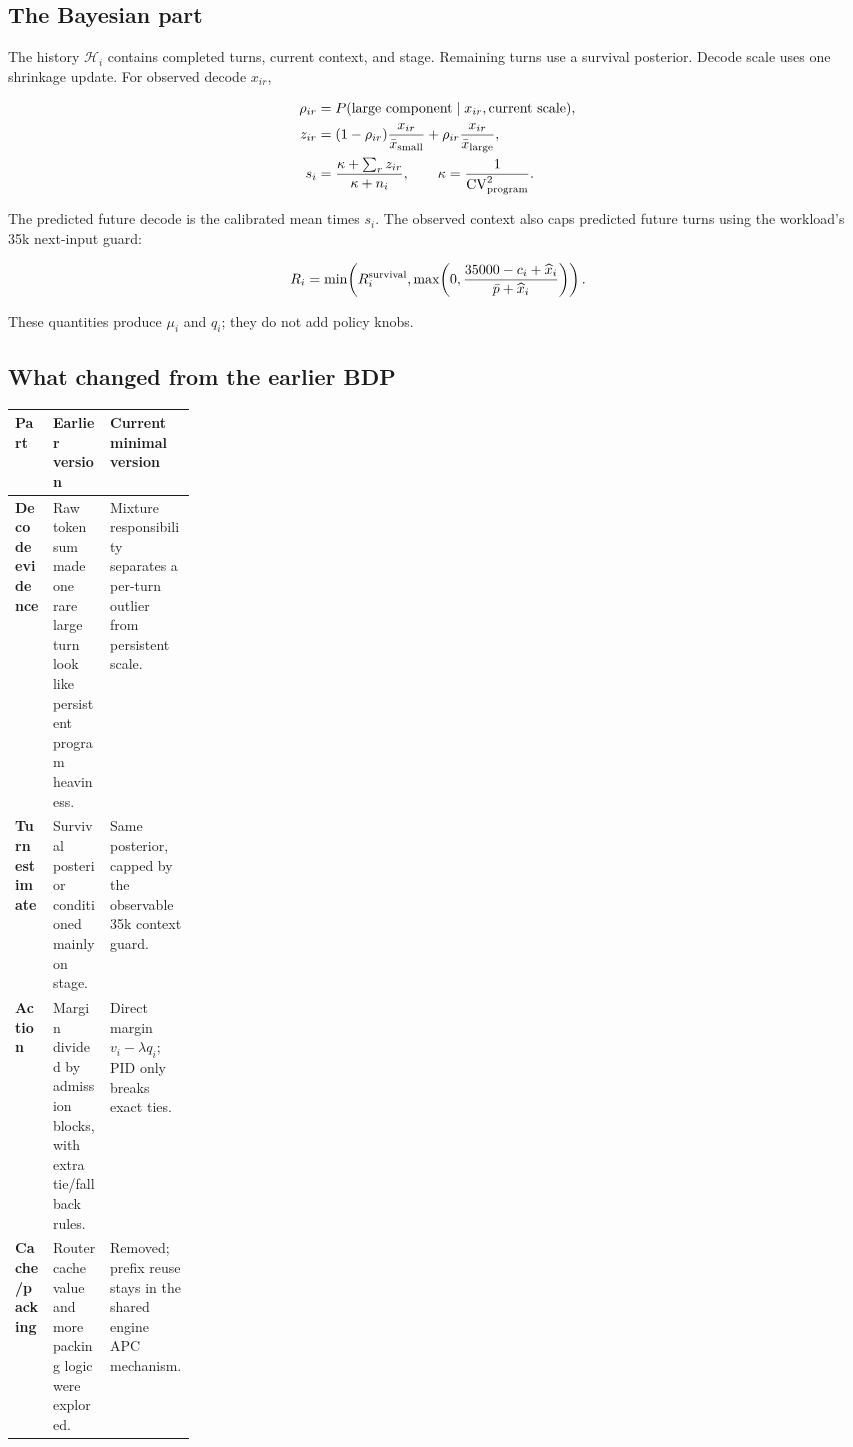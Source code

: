 \documentclass[10pt]{article}
\begin{document}
\subsection*{The Bayesian part}

The history $\mathcal H_i$ contains completed turns, current context, and stage. Remaining turns use a survival posterior. Decode scale uses one shrinkage update. For observed decode $x_{ir}$,

\begin{align}
\rho_{ir} &= P(\text{large component}\mid x_{ir},\text{current scale}),\\
z_{ir} &= (1-\rho_{ir})\frac{x_{ir}}{\bar x_{\rm small}}
       + \rho_{ir}\frac{x_{ir}}{\bar x_{\rm large}},\\
s_i &= \frac{\kappa+\sum_r z_{ir}}{\kappa+n_i},
\qquad \kappa=\frac{1}{\mathrm{CV}_{\rm program}^{2}}.
\end{align}

The predicted future decode is the calibrated mean times $s_i$. The observed context also caps predicted future turns using the workload's 35k next-input guard:

\begin{equation}
R_i=\min\!\left(R_i^{\rm survival},
\max\!\left(0,\frac{35000-c_i+\widehat x_i}{\bar p+\widehat x_i}\right)\right).
\end{equation}

These quantities produce $\mu_i$ and $q_i$; they do not add policy knobs.

\subsection*{What changed from the earlier BDP}

\begin{table}[h]
\centering
\small
\begin{tabularx}{\linewidth}{>{\bfseries}p{0.21\linewidth} X X}
\toprule
Part & Earlier version & Current minimal version \\
\midrule
Decode evidence & Raw token sum made one rare large turn look like persistent program heaviness. & Mixture responsibility separates a per-turn outlier from persistent scale. \\
Turn estimate & Survival posterior conditioned mainly on stage. & Same posterior, capped by the observable 35k context guard. \\
Action & Margin divided by admission blocks, with extra tie/fallback rules. & Direct margin $v_i-\lambda q_i$; PID only breaks exact ties. \\
Cache/packing & Router cache value and more packing logic were explored. & Removed; prefix reuse stays in the shared engine APC mechanism. \\
\bottomrule
\end{tabularx}
\end{table}
\end{document}
